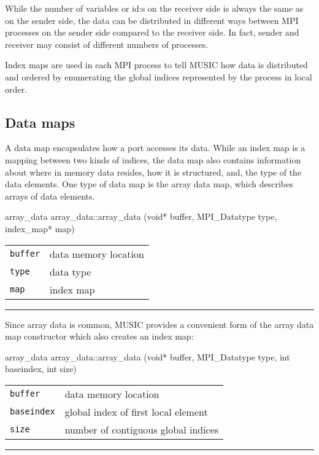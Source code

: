 \documentclass[a4paper]{report}
\makeatletter
\newenvironment{parameters}%
{\begin{tabular}{@{\hspace{2em}}lp{0.6\textwidth}}}%
{\end{tabular}\par\vspace{1mm}\par\hrule\par\vspace{5mm}}
\makeatother
\begin{document}
While the number of variables or id:s on the receiver side is always
the same as on the sender side, the data can be distributed in
different ways between MPI processes on the sender side compared to
the receiver side.  In fact, sender and receiver may consist of
different numbers of processes.

Index maps are used in each MPI process to tell MUSIC how data is
distributed and ordered by enumerating the global indices represented
by the process in local order.

\subsection{Data maps}
\label{sec:datamap}

A data map encapsulates how a port accesses its data.  While an index
map is a mapping between two kinds of indices, the data map also
contains information about where in memory data resides, how it is
structured, and, the type of the data elements.  One type of data map
is the array data map, which describes arrays of data elements.

\begin{head}{array_data}
  array_data::array_data (void* buffer, MPI_Datatype type,
                          index_map* map)
\end{head}
\begin{parameters}
  \lstinline|buffer| & data memory location \\
  \lstinline|type|   & data type \\
  \lstinline|map|    & index map \\
\end{parameters}

Since array data is common, MUSIC provides a convenient form of the
array data map constructor which also creates an index map:

\begin{head}{array_data}
  array_data::array_data (void* buffer,
                          MPI_Datatype type,
                          int  baseindex,
                          int size)
\end{head}
\begin{parameters}
  \lstinline|buffer|    & data memory location \\
  \lstinline|baseindex| & global index of first local element \\
  \lstinline|size|      & number of contiguous global indices \\
\end{parameters}
\end{document}

